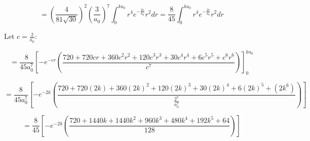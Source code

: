 \documentclass[11pt]{article}
\begin{document}
\vspace{2mm}
\[=\left(\frac{4}{81\sqrt{30}}\right)^2\left(\frac{3}{a_0}\right)^7
\int^{ka_0}_0 r^4e^{-\frac{2r}{a_0}}r^2dr=\frac{8}{45}\int^{ka_0}_0r^4e^{-\frac{2r}{a_0}}r^2 dr\]

Let $c=\frac{2}{a_0}$:

\[=\frac{8}{45a_0^7}\left[-e^{-cr}\left(
\frac{720+720cr+360c^2r^2+120c^3r^3+30c^4r^4+6c^5r^5+c^6r^6}{c^7}
\right)\right]^{ka_0}_{0}\]

\[=\frac{8}{45a_0^7}\left[-e^{-2k}\left(
\frac{720+720(2k)+360(2k)^2+120(2k)^3+30(2k)^4+6(2k)^5+(2k^6)}{\frac{2^7}{a_0^7}}
\right) \right]\]

\[=\frac{8}{45}\left[-e^{-2k}\left(\frac{720+1440k+1440k^2+960k^3+480k^4+192k^5+64}{128}\right)\right]\]
\end{document}
